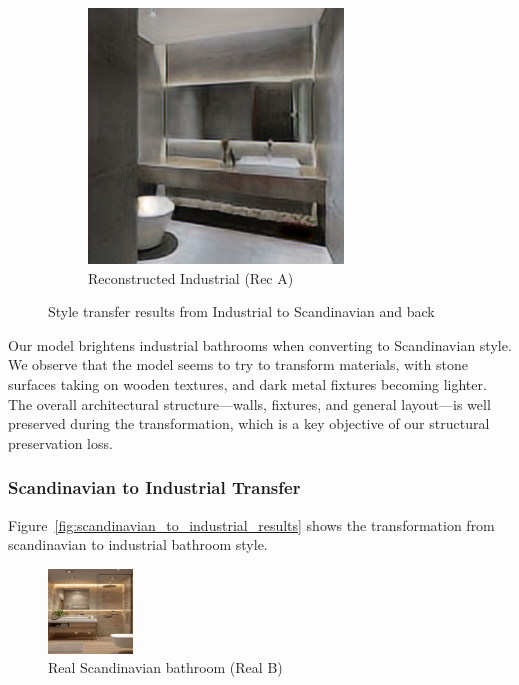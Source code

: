 \documentclass[twocolumn,superscriptaddress,aps]{revtex4-1}
\begin{document}
\begin{figure}[h]
\begin{subfigure}{0.2\textwidth}
    \includegraphics[width=\textwidth]{assets/rec_A.png}
    \caption{Reconstructed Industrial (Rec A)}
    \label{fig:reconstructed_industrial}
\end{subfigure}
\caption{Style transfer results from Industrial to Scandinavian and back}
\label{fig:industrial_to_scandinavian_results}
\end{figure}

Our model brightens industrial bathrooms when converting to Scandinavian style. We observe that the model seems to try to transform materials, with stone surfaces taking on wooden textures, and dark metal fixtures becoming lighter. The overall architectural structure—walls, fixtures, and general layout—is well preserved during the transformation, which is a key objective of our structural preservation loss.

\subsubsection{Scandinavian to Industrial Transfer}

Figure~\ref{fig:scandinavian_to_industrial_results} shows the transformation from scandinavian to industrial bathroom style.

\begin{figure}[h]
\centering
\includegraphics[width=0.2\textwidth]{assets/real_B.png}
\caption{Real Scandinavian bathroom (Real B)}
\label{fig:real_scandinavian}
\end{figure}
\end{document}
